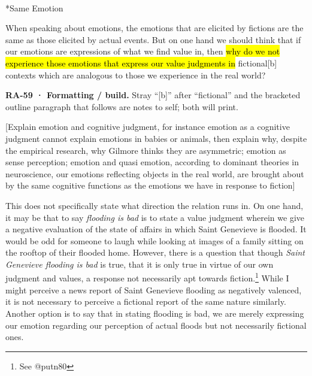 \documentclass[
  letterpaper,
  DIV=11,
  numbers=noendperiod]{scrartcl}
\makeatletter
\let\oldparagraph\paragraph
\renewcommand{\paragraph}{
    \@ifstar
      \xxxParagraphStar
      \xxxParagraphNoStar
  }
\newcommand{\xxxParagraphStar}[1]{\oldparagraph*{#1}\mbox{}}
\newcommand{\xxxParagraphNoStar}[1]{\oldparagraph{#1}\mbox{}}
\theoremstyle{remark}
\makeatother
\begin{document}
\paragraph*{Same Emotion}\label{same-emotion}

When speaking about emotions, the emotions that are elicited by fictions
are the same as those elicited by actual events. But on one hand we
should think that if our emotions are expressions of what we find value
in, then \hl{why do we not experience those emotions that express our
value judgments in} fictional{[}b{]} contexts which are analogous to
those we experience in the real world?

\begin{tcolorbox}[enhanced jigsaw, arc=.35mm, bottomrule=.15mm, bottomtitle=1mm, breakable, colback=white, colbacktitle=quarto-callout-note-color!10!white, colframe=quarto-callout-note-color-frame, coltitle=black, left=2mm, leftrule=.75mm, opacityback=0, opacitybacktitle=0.6, rightrule=.15mm, title=\textcolor{quarto-callout-note-color}{\faInfo}\hspace{0.5em}{Note}, titlerule=0mm, toprule=.15mm, toptitle=1mm]

\textbf{RA-59 · Formatting / build.} Stray ``{[}b{]}'' after
``fictional'' and the bracketed outline paragraph that follows are notes
to self; both will print.

\end{tcolorbox}

{[}Explain emotion and cognitive judgment, for instance emotion as a
cognitive judgment cannot explain emotions in babies or animals, then
explain why, despite the empirical research, why Gilmore thinks they are
asymmetric; emotion as sense perception; emotion and quasi emotion,
according to dominant theories in neuroscience, our emotions reflecting
objects in the real world, are brought about by the same cognitive
functions as the emotions we have in response to fiction{]}

This does not specifically state what direction the relation runs in. On
one hand, it may be that to say \emph{flooding is bad} is to state a
value judgment wherein we give a negative evaluation of the state of
affairs in which Saint Genevieve is flooded. It would be odd for someone
to laugh while looking at images of a family sitting on the rooftop of
their flooded home. However, there is a question that though \emph{Saint
Genevieve flooding is bad} is true, that it is only true in virtue of
our own judgment and values, a response not necessarily apt towards
fiction.\footnote{See @putn80} While I might perceive a news report of
Saint Genevieve flooding as negatively valenced, it is not necessary to
perceive a fictional report of the same nature similarly. Another option
is to say that in stating flooding is bad, we are merely expressing our
emotion regarding our perception of actual floods but not necessarily
fictional ones.
\end{document}
